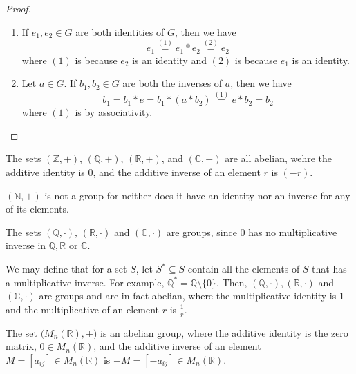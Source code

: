 \begin{proof}
  \begin{enumerate}
    \item If $e_1, e_2 \in G$ are both identities of $G$, then we have
      \begin{equation*}
        e_1 \overset{(1)}{=} e_1 * e_2 \overset{(2)}{=} e_2
      \end{equation*}
      where $(1)$ is because $e_2$ is an identity and $(2)$ is because $e_1$ is an identity.

    \item Let $a \in G$. If $b_1, b_2 \in G$ are both the inverses of $a$, then we have
      \begin{equation*}
        b_1 = b_1 * e = b_1 * (a * b_2) \overset{(1)}{=} e * b_2 = b_2
      \end{equation*}
      where $(1)$ is by associativity.
  \end{enumerate}
\end{proof}

\begin{eg}
  The sets $(\mathbb{Z}, +), \, (\mathbb{Q}, +), \, (\mathbb{R}, +)$, and $(\mathbb{C}, +)$ are all abelian, wehre the additive identity is $0$, and the additive inverse of an element $r$ is $(-r)$.
\end{eg}

\begin{note}
  $(\mathbb{N}, +)$ is not a group for neither does it have an identity nor an inverse for any of its elements.
\end{note}

\begin{eg}
  The sets $(\mathbb{Q}, \cdot), \, (\mathbb{R}, \cdot)$ and $(\mathbb{C}, \cdot)$ are  groups, since $0$ has no multiplicative inverse in $\mathbb{Q}, \mathbb{R}$ or $\mathbb{C}$.
\end{eg}

We may define that for a set $S$, let $S^* \subseteq S$ contain all the elements of $S$ that has a multiplicative inverse. For example, $\mathbb{Q}^* = \mathbb{Q} \setminus \{0\}$. Then, $(\mathbb{Q}, \cdot), (\mathbb{R}, \cdot)$ and $(\mathbb{C}, \cdot)$ are groups and are in fact abelian, where the multiplicative identity is $1$ and the multiplicative of an element $r$ is $\frac{1}{r}$.

\begin{eg}
  The set $\big( M_n(\mathbb{R}), + \big)$ is an abelian group, where the additive identity is the zero matrix, $0 \in M_n(\mathbb{R})$, and the additive inverse of an element $M = [a_{ij}] \in M_n(\mathbb{R})$ is $-M = [-a_{ij}] \in M_n(\mathbb{R})$.
\end{eg}

